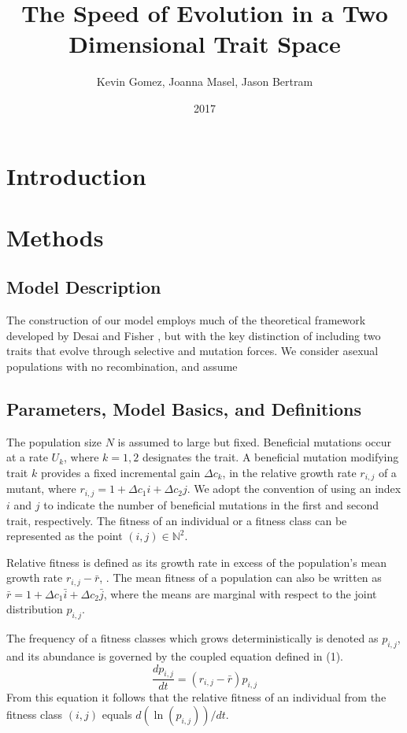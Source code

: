 \documentclass{article}
\begin{document}
\title{The Speed of Evolution in a Two Dimensional Trait Space}
\author{Kevin Gomez, Joanna Masel, Jason Bertram}
\date{2017}

\maketitle
\newpage

\section*{Introduction}

\section*{Methods}
\subsection*{Model Description}
The construction of our model employs much of the theoretical framework developed by Desai and Fisher \citep{DesFish07}, but with the key distinction of including two traits that evolve through selective and mutation forces.  We consider asexual populations with no recombination, and assume 

\subsection*{Parameters, Model Basics, and Definitions}
The population size $N$ is assumed to large but fixed.  Beneficial mutations occur at a rate $U_k$, where $k=1,2$ designates the trait.  A beneficial mutation modifying trait $k$ provides a fixed incremental gain $\Delta c_k$, in the relative growth rate $r_{i,j}$ of a mutant, where $r_{i,j}=1+\Delta c_1 i + \Delta c_2 j$.  We adopt the convention of using an index $i$ and $j$ to indicate the number of beneficial mutations in the first and second trait, respectively.  The fitness of an individual or a fitness class can be represented as the point $(i,j) \in \mathbb{N}^2$.  

Relative fitness is defined as its growth rate in excess of the population's mean growth rate $r_{i,j}-\bar{r}$, .  The mean fitness of a population can also be written as $\bar{r}=1+\Delta c_1 \bar{i} + \Delta c_2 \bar{j}$, where the means are marginal with respect to the joint distribution $p_{i,j}$.  

The frequency of a fitness classes which grows deterministically is denoted as $p_{i,j}$, and its abundance is governed by the coupled equation defined in (1).
\begin{equation}
\frac{dp_{i,j}}{dt}=(r_{i,j}-\bar{r})p_{i,j}
\end{equation}
From this equation it follows that the relative fitness of an individual from the fitness class $(i,j)$ equals $d(\ln(p_{i,j}))/dt$.  
\end{document}
